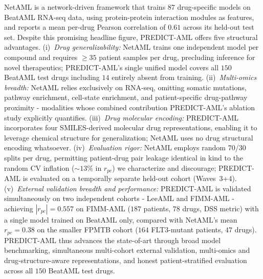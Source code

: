 \documentclass[pdflatex,sn-mathphys-num]{sn-jnl}
\theoremstyle{thmstyleone}
\theoremstyle{thmstyletwo}
\theoremstyle{thmstylethree}
\begin{document}
NetAML \cite{wang2025netaml} is a network-driven framework that trains $87$ drug-specific models on BeatAML RNA-seq data, using protein-protein interaction modules as features, and reports a mean per-drug Pearson correlation of $0.61$ across its held-out test set. Despite this promising headline figure, PREDICT-AML offers five structural advantages. (i)~\textit{Drug generalizability:} NetAML trains one independent model per compound and requires $\geq\!35$ patient samples per drug, precluding inference for novel therapeutics; PREDICT-AML's single unified model covers all $150$ BeatAML test drugs including $14$ entirely absent from training. (ii)~\textit{Multi-omics breadth:} NetAML relies exclusively on RNA-seq, omitting somatic mutations, pathway enrichment, cell-state enrichment, and patient-specific drug-pathway proximity - modalities whose combined contribution PREDICT-AML's ablation study explicitly quantifies. (iii)~\textit{Drug molecular encoding:} PREDICT-AML incorporates four SMILES-derived molecular drug representations, enabling it to leverage chemical structure for generalization; NetAML uses no drug structural encoding whatsoever. (iv)~\textit{Evaluation rigor:} NetAML employs random 70/30 splits per drug, permitting patient-drug pair leakage identical in kind to the random CV inflation ($\sim\!13\%$ in $r_{pc}$) we characterize and discourage; PREDICT-AML is evaluated on a temporally separate held-out cohort (Waves~3+4). (v)~\textit{External validation breadth and performance:} PREDICT-AML is validated simultaneously on two independent cohorts - LeeAML and FIMM-AML - achieving $|r_{pc}| = 0.557$ on FIMM-AML ($187$ patients, $78$ drugs, DSS metric) with a single model trained on BeatAML only, compared with NetAML's mean $r_{pc} = 0.38$ on the smaller FPMTB cohort ($164$ FLT3-mutant patients, $47$ drugs). PREDICT-AML thus advances the state-of-art through broad model benchmarking, simultaneous multi-cohort external validation, multi-omics and drug-structure-aware representations, and honest patient-stratified evaluation across all $150$ BeatAML test drugs.
\end{document}
